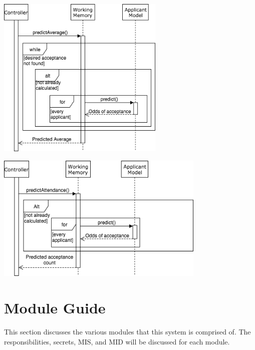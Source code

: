 \documentclass[titlepage]{article}
\begin{document}
\begin{center}
	\includegraphics[width=0.6\textwidth]{AdvolPredictAverageSequenceDiagram.png}
\label{fig:predict average sequence diagram}
\end{center}
\begin{center}
	\includegraphics[width=0.75\textwidth]{AdvolPredictAcceptanceSequenceDiagram.png}
\label{fig:predict acceptance sequence diagram}
\end{center}



\section{Module Guide}
This section discusses the various modules that this system is comprised of. The responsibilities, secrets, MIS, and MID will be discussed for each module.
\end{document}
